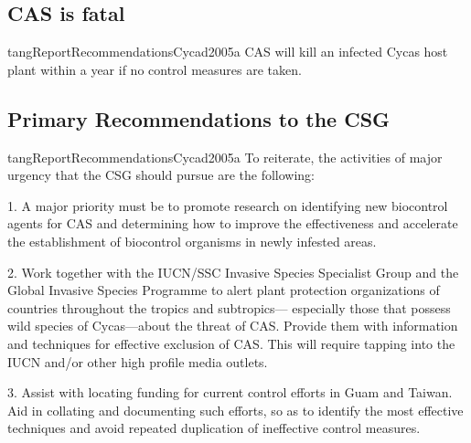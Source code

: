 \begin{appendices}
\subsection{CAS is fatal}

\begin{displaycquote}{tangReportRecommendationsCycad2005a}
CAS will kill an infected Cycas host plant within a year if no control measures
are taken.
\end{displaycquote}

\subsection{Primary Recommendations to the CSG}
\begin{displaycquote}{tangReportRecommendationsCycad2005a}
To reiterate, the activities of major urgency that the CSG should pursue are the following:

1. A major priority must be to promote research on identifying new biocontrol agents for CAS and
determining how to improve the effectiveness and accelerate the establishment of biocontrol organisms
in newly infested areas.

2. Work together with the IUCN/SSC Invasive Species Specialist Group and the Global Invasive Species
Programme to alert plant protection organizations of countries throughout the tropics and subtropics—
especially those that possess wild species of Cycas—about the threat of CAS. Provide them with
information and techniques for effective exclusion of CAS. This will require tapping into the IUCN
and/or other high profile media outlets.

3. Assist with locating funding for current control efforts in Guam and Taiwan. Aid in collating and
documenting such efforts, so as to identify the most effective techniques and avoid repeated
duplication of ineffective control measures.
\end{displaycquote}

\end{appendices}

